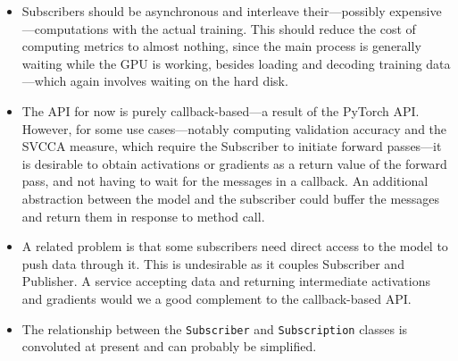 \begin{itemize}
    \item Subscribers should be asynchronous and interleave their---possibly
        expensive---computations with the actual training. This should reduce
        the cost of computing metrics to almost nothing, since the main process
        is generally waiting while the GPU is working, besides loading and
        decoding training data---which again involves waiting on the hard disk.
    \item The API for now is purely callback-based---a result of the PyTorch
        API. However, for some use cases---notably computing validation
        accuracy and the SVCCA measure, which require the Subscriber to initiate
        forward passes---it is desirable to obtain activations or gradients as
        a return value of the forward pass, and not having to wait for the
        messages in a callback. An additional abstraction between the model and
        the subscriber could buffer the messages and return them in response to
        method call.
    \item A related problem is that some subscribers need direct access to the
        model to push data through it. This is undesirable as it couples
        Subscriber and Publisher. A service accepting data and returning
        intermediate activations and gradients would we a good complement to the
        callback-based API.
    \item The relationship between the \texttt{Subscriber} and
        \texttt{Subscription} classes is convoluted at present and can probably
        be simplified.
\end{itemize}

